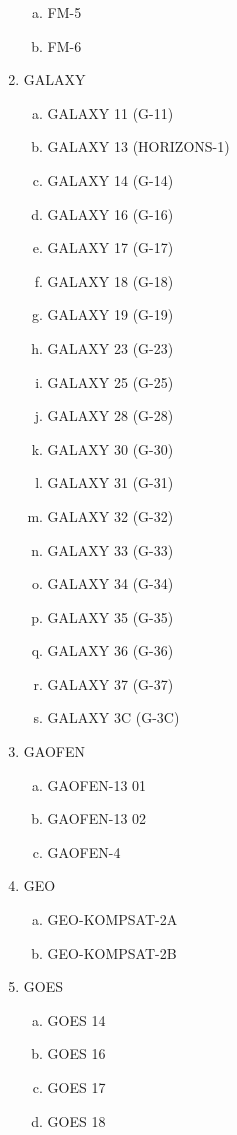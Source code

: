 \begin{multicols}{2}
\begin{enumerate}
\begin{enumerate}[a.]
    \item FM-5
    \item FM-6
  \end{enumerate}
  \item GALAXY
  \begin{enumerate}[a.]
    \item GALAXY 11 (G-11)
    \item GALAXY 13 (HORIZONS-1)
    \item GALAXY 14 (G-14)
    \item GALAXY 16 (G-16)
    \item GALAXY 17 (G-17)
    \item GALAXY 18 (G-18)
    \item GALAXY 19 (G-19)
    \item GALAXY 23 (G-23)
    \item GALAXY 25 (G-25)
    \item GALAXY 28 (G-28)
    \item GALAXY 30 (G-30)
    \item GALAXY 31 (G-31)
    \item GALAXY 32 (G-32)
    \item GALAXY 33 (G-33)
    \item GALAXY 34 (G-34)
    \item GALAXY 35 (G-35)
    \item GALAXY 36 (G-36)
    \item GALAXY 37 (G-37)
    \item GALAXY 3C (G-3C)
  \end{enumerate}
  \item GAOFEN
  \begin{enumerate}[a.]
    \item GAOFEN-13 01
    \item GAOFEN-13 02
    \item GAOFEN-4
  \end{enumerate}
  \item GEO
  \begin{enumerate}[a.]
    \item GEO-KOMPSAT-2A
    \item GEO-KOMPSAT-2B
  \end{enumerate}
  \item GOES
  \begin{enumerate}[a.]
    \item GOES 14
    \item GOES 16
    \item GOES 17
    \item GOES 18

\end{enumerate}
\end{enumerate}
\end{multicols}
